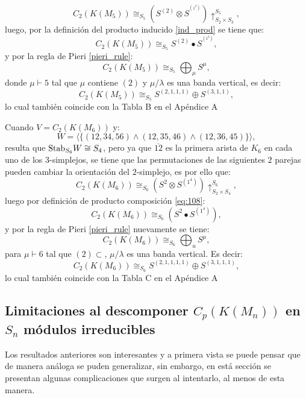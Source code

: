 \documentclass[12pt]{book}
\theoremstyle{definition}
\newcounter{in}
\newcounter{ini}
\begin{document}
\begin{equation}
C_{2}(K(M_{5})) \cong_{S_{5}} (S^{(2)} \otimes S^{^{(1^{3})}}) \uparrow_{S_{2} \times S_{3}}^{S_{5}},
\end{equation}
luego, por la definición del producto inducido \ref{ind_prod} se tiene que:
\begin{equation}
C_{2}(K(M_{5})) \cong_{S_{5}} S^{(2)} \bullet S^{^{(1^{3})}},
\end{equation}
y por la regla de Pieri \ref{pieri_rule}:
\begin{equation}
C_{2}(K(M_{5})) \cong_{S_{5}} \bigoplus_{\mu} S^{\mu},
\end{equation}
donde $\mu \vdash 5$ tal que $\mu$ contiene $(2)$ y $\mu / \lambda$ es una banda vertical, es decir:
\begin{equation}
C_{2}(K(M_{5})) \cong_{S_{5}} S^{(2,1,1,1)} \oplus S^{(3,1,1)},
\end{equation}
lo cual también coincide con la Tabla B en el Apéndice A 


Cuando $V = C_{2}(K(M_{6}))$ y:
$$W = \langle \{(12,34,56) \wedge (12,35,46) \wedge (12,36,45) \} \rangle,$$
resulta que $\textup{Stab}_{S_{6}} W \cong S_{4}$, pero ya que $\overline{12}$ es la primera arista de $K_{6}$ en cada uno de los $3$-simplejos, se tiene que las permutaciones de las siguientes $2$ parejas pueden cambiar la orientación del $2$-simplejo, es por ello que:
\begin{equation}
C_{2}(K(M_{6}))  \cong_{S_{6}} (S^{2} \otimes S^{(1^{4})}) \uparrow_{S_{2} \times S_{4}}^{S_{6}},
\end{equation}
luego por definición de producto composición \ref{eq:108}:
\begin{equation}
C_{2}(K(M_{6}))  \cong_{S_{6}} (S^{2} \bullet S^{(1^{4})}),
\end{equation}
y por la regla de Pieri \ref{pieri_rule} nuevamente se tiene:
\begin{equation}
C_{2}(K(M_{6})) \cong_{S_{6}} \bigoplus_{u} S^{\mu}, 
\end{equation}
para $\mu \vdash 6$ tal que $(2) \subset $, $\mu / \lambda$ es una banda vertical. Es decir:
\begin{equation}
C_{2}(K(M_{6})) \cong_{S_{6}} S^{(2,1,1,1,1)} \oplus S^{(3,1,1,1)},
\end{equation}
lo cual también coincide con la Tabla C en el Apéndice A 


\subsection{Limitaciones al descomponer $C_{p}(K(M_n))$ en $S_{n}$ módulos irreducibles}
\label{Lim}
Los resultados anteriores son interesantes y a primera vista se puede pensar que de manera análoga se puden generalizar, sin embargo, en está sección se presentan algunas complicaciones que surgen al intentarlo, al menos de esta manera.
\end{document}
